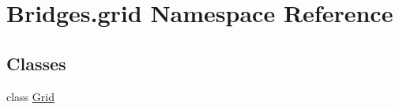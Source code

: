 \hypertarget{namespace_bridges_1_1grid}{}\section{Bridges.\+grid Namespace Reference}
\label{namespace_bridges_1_1grid}
\subsection*{Classes}
\begin{DoxyCompactItemize}
\item 
class \mbox{\hyperlink{class_bridges_1_1grid_1_1_grid}{Grid}}
\end{DoxyCompactItemize}
